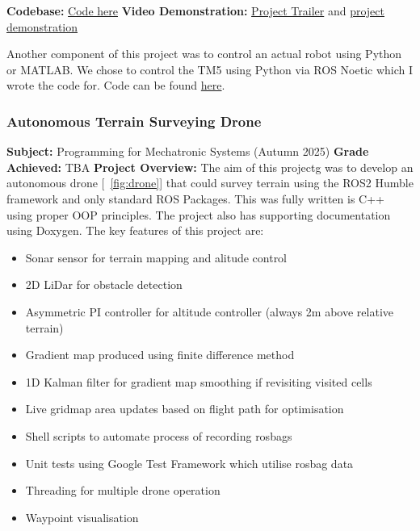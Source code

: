 \textbf{Codebase: } \href{https://github.com/jackfruittt/Industrial_Robotics_A2}{Code here} \newline
\textbf{Video Demonstration: } \href{https://www.youtube.com/watch?v=JsQmZcRGo9Y}{Project Trailer} and \href{https://youtu.be/irytygtPb94}{project demonstration} \newline

Another component of this project was to control an actual robot using Python or MATLAB. We chose to control the TM5 using Python via ROS Noetic which I wrote the code for. 
Code can be found \href{https://github.com/jackfruittt/tm5_ros_python}{here}.




\newpage
\subsubsection{Autonomous Terrain Surveying Drone}
\textbf{Subject: } Programming for Mechatronic Systems (Autumn 2025) \newline
\textbf{Grade Achieved: } TBA \newline
\textbf{Project Overview: }
The aim of this projectg was to develop an autonomous drone [~\ref{fig:drone}] that could survey terrain using the ROS2 Humble framework and only standard ROS Packages. This was fully written is C++
using proper OOP principles. The project also has supporting documentation using Doxygen. The key features of this project are:

\begin{itemize}
    \item Sonar sensor for terrain mapping and alitude control
    \item 2D LiDar for obstacle detection
    \item Asymmetric PI controller for altitude controller (always 2m above relative terrain)
    \item Gradient map produced using finite difference method
    \item 1D Kalman filter for gradient map smoothing if revisiting visited cells
    \item Live gridmap area updates based on flight path for optimisation
    \item Shell scripts to automate process of recording rosbags
    \item Unit tests using Google Test Framework which utilise rosbag data
    \item Threading for multiple drone operation
    \item Waypoint visualisation
\end{itemize}

